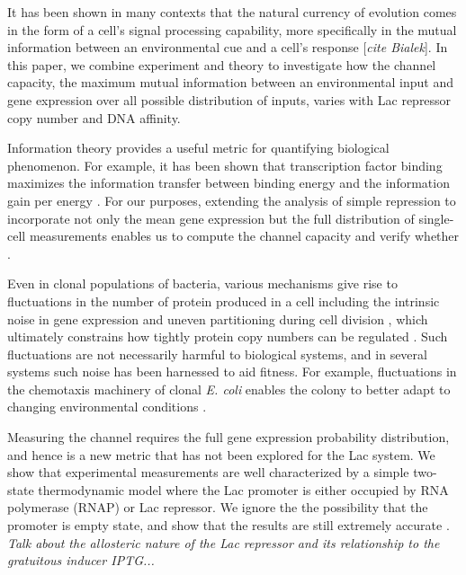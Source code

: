 It has been shown in many contexts that the natural currency of evolution comes
in the form of a cell's signal processing capability, more specifically in the
mutual information between an environmental cue and a cell's response
[\textit{cite Bialek}].  In
this paper, we combine experiment and theory to investigate how the channel
capacity, the maximum mutual information between an environmental input and gene
expression over all possible distribution of inputs, varies with Lac repressor
copy number and DNA affinity. 

Information theory provides a useful metric for quantifying biological
phenomenon. For example, it has been shown that transcription factor binding
maximizes the information transfer between binding energy and the information
gain per energy \cite{Savir2016} . For our purposes, extending the analysis of simple repression to
incorporate not only the mean gene expression but the full distribution of
single-cell measurements enables us to compute the channel capacity and verify
whether .

Even in clonal populations of bacteria, various mechanisms give rise to
fluctuations in the number of protein produced in a cell including the intrinsic
noise in gene expression \cite{Elowitz2002} and uneven partitioning during cell
division \cite{Huh2011}, which ultimately constrains how tightly protein copy
numbers can be regulated \cite{Lestas2010}. Such fluctuations are not
necessarily harmful to biological systems, and in several systems such noise has
been harnessed to aid fitness. For example, fluctuations in the chemotaxis
machinery of clonal \textit{E. coli} enables the colony to better adapt to
changing environmental conditions \cite{Frankel2014}.

Measuring the channel requires the full gene expression probability
distribution, and hence is a new metric that has not been explored for the Lac
system. We show that experimental measurements are well characterized by a simple two-state thermodynamic model where the Lac promoter is either occupied by RNA polymerase (RNAP) or Lac repressor. We ignore the the possibility that the promoter is empty state, and show that the results are still extremely accurate . \textit{Talk about the allosteric nature of the Lac repressor and its relationship to the gratuitous inducer IPTG...}

